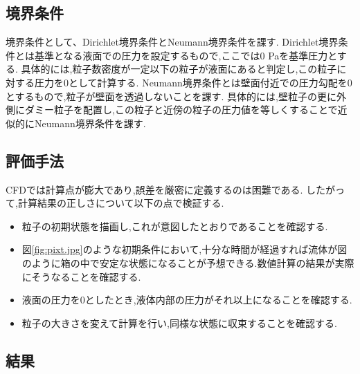 \documentclass[uplatex,a4j,11pt]{jsarticle}
\begin{document}
\subsection{境界条件}
境界条件として、Dirichlet境界条件とNeumann境界条件を課す.
Dirichlet境界条件とは基準となる液面での圧力を設定するもので,ここでは0 Paを基準圧力とする.
具体的には,粒子数密度が一定以下の粒子が液面にあると判定し,この粒子に対する圧力を0として計算する.
Neumann境界条件とは壁面付近での圧力勾配を0とするもので,粒子が壁面を透過しないことを課す.
具体的には,壁粒子の更に外側にダミー粒子を配置し,この粒子と近傍の粒子の圧力値を等しくすることで近似的にNeumann境界条件を課す.
\subsection{評価手法}
CFDでは計算点が膨大であり,誤差を厳密に定義するのは困難である.
したがって,計算結果の正しさについて以下の点で検証する.
\begin{itemize}
    \item 粒子の初期状態を描画し,これが意図したとおりであることを確認する.
    \item 図\ref{fig:pixt.jpg}のような初期条件において,十分な時間が経過すれば流体が図のように箱の中で安定な状態になることが予想できる.数値計算の結果が実際にそうなることを確認する.
    \item 液面の圧力を0としたとき,液体内部の圧力がそれ以上になることを確認する.
    \item 粒子の大きさを変えて計算を行い,同様な状態に収束することを確認する.
\end{itemize}
\subsection{結果}

\end{document}
